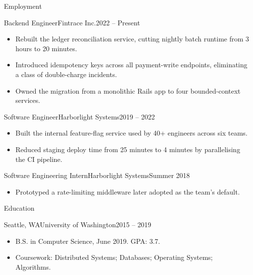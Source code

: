 \documentclass[]{mcdowellcv}
\begin{document}
	\makeheader

	\begin{cvsection}{Employment}
		\begin{cvsubsection}{Backend Engineer}{Fintrace Inc.}{2022 -- Present}
			\begin{itemize}
				\item Rebuilt the ledger reconciliation service, cutting nightly batch runtime from 3 hours to 20 minutes.
				\item Introduced idempotency keys across all payment-write endpoints, eliminating a class of double-charge incidents.
				\item Owned the migration from a monolithic Rails app to four bounded-context services.
			\end{itemize}
		\end{cvsubsection}

		\begin{cvsubsection}{Software Engineer}{Harborlight Systems}{2019 -- 2022}
			\begin{itemize}
				\item Built the internal feature-flag service used by 40+ engineers across six teams.
				\item Reduced staging deploy time from 25 minutes to 4 minutes by parallelising the CI pipeline.
			\end{itemize}
		\end{cvsubsection}

		\begin{cvsubsection}{Software Engineering Intern}{Harborlight Systems}{Summer 2018}
			\begin{itemize}
				\item Prototyped a rate-limiting middleware later adopted as the team's default.
			\end{itemize}
		\end{cvsubsection}
	\end{cvsection}

	\begin{cvsection}{Education}
		\begin{cvsubsection}{Seattle, WA}{University of Washington}{2015 -- 2019}
			\begin{itemize}
				\item B.S. in Computer Science, June 2019. GPA: 3.7.
				\item Coursework: Distributed Systems; Databases; Operating Systems; Algorithms.
			\end{itemize}
		\end{cvsubsection}
	\end{cvsection}
\end{document}

